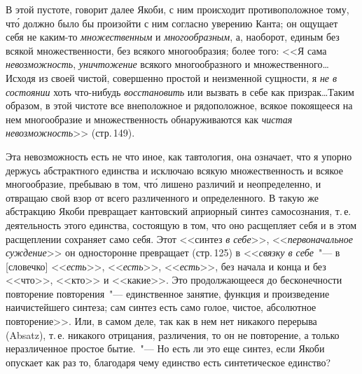 В этой пустоте, говорит далее Якоби, с ним происходит
противоположное тому, чт\'о должно было бы произойти
с ним согласно уверению Канта; он ощущает себя не
каким-то \emph{множественным} и \emph{многообразным}, а, наоборот,
единым без всякой множественности, без всякого многообразия;
более того: <<Я сама \emph{невозможность}, \emph{уничтожение}
всякого многообразного и множественного\dots Исходя из
своей чистой, совершенно простой и неизменной сущности,
я \emph{не в состоянии} хоть что-нибудь \emph{восстановить} или
вызвать в себе как призрак\dots Таким образом, в этой чистоте
все внеположное и рядоположное, всякое покоящееся
на нем многообразие и множественность обнаруживаются
как \emph{чистая невозможность}>> (стр.\,149).

Эта невозможность есть не что иное, как тавтология,
она означает, что я упорно держусь абстрактного единства
и исключаю всякую множественность и всякое многообразие,
пребываю в том, чт\'о лишено различий и неопределенно,
и отвращаю свой взор от всего различенного
и определенного. В такую же абстракцию Якоби превращает
кантовский априорный синтез самосознания, т.\,е. деятельность
этого единства, состоящую в том, что оно расщепляет
себя и в этом расщеплении сохраняет само себя.
Этот <<синтез \emph{в себе}>>, <<\emph{первоначальное суждение}>> он односторонне
превращает (стр.\,125) в <<\emph{связку в себе}~"--- в
[словечко] <<\emph{есть}>>, <<\emph{есть}>>, <<\emph{есть}>>, без начала и конца и
без <<что>>, <<кто>> и <<какие>>. Это продолжающееся до бесконечности
повторение повторения~"--- единственное занятие,
функция и произведение наичистейшего синтеза; сам
синтез есть само голое, чистое, абсолютное повторение>>.
Или, в самом деле, так как в нем нет никакого перерыва
(Absatz), т.\,е. никакого отрицания, различения, то он не
повторение, а только неразличенное простое бытие.~"--- Но
есть ли это еще синтез, если Якоби опускает как раз то,
благодаря чему единство есть синтетическое единство?

